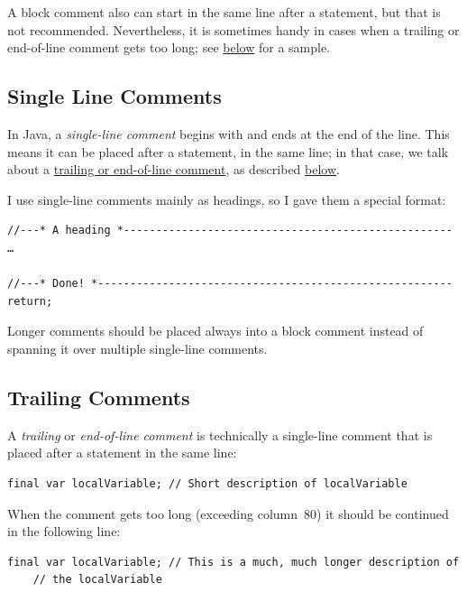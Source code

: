 A block comment also can start in the same line after a statement, but that is not recommended. Nevertheless, it is sometimes handy in cases when a trailing or end-of-line comment gets too long; see \hyperref[sec:TrailingComments]{below} for a sample.


\subsection{Single Line Comments}\label{sec:SingleLineComments}
In Java, a \textit{single-line comment} begins with \bdq{\lstinline|//|} and ends at the end of the line. This means it can be placed after a statement, in the same line; in that case, we talk about a \hyperref[sec:TrailingComments]{trailing or end-of-line comment}, as described \hyperref[sec:TrailingComments]{below}.

I use single-line comments mainly as headings, so I gave them a special format:
\begin{lstlisting}
//---* A heading *---------------------------------------------------
…

//---* Done! *-------------------------------------------------------
return;
\end{lstlisting}

Longer comments should be placed always into a block comment instead of spanning it over multiple single-line comments. 


\subsection{Trailing Comments}\label{sec:TrailingComments}
A \textit{trailing} or \textit{end-of-line comment} is technically a single-line comment that is placed after a statement in the same line:
\begin{lstlisting}
final var localVariable; // Short description of localVariable
\end{lstlisting}

When the comment gets too long (exceeding column~80) it should be continued in the following line:
\begin{lstlisting}
final var localVariable; // This is a much, much longer description of 
    // the localVariable
\end{lstlisting}

